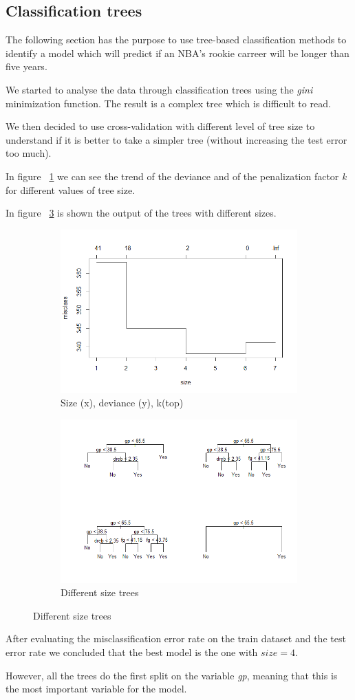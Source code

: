 \subsection{Classification trees}

The following section has the purpose to use tree-based classification methods to identify a model which will predict if an NBA's rookie carreer will be longer than five years.

We started to analyse the data through classification trees using the \textit{gini} minimization function. The result is a complex tree which is difficult to read.

We then decided to use cross-validation with different level of tree size to understand if it is better to take a simpler tree (without increasing the test error too much).

In figure \Fig~\ref{fig:tree_cv_plot} we can see the trend of the deviance and of the penalization factor \textit{k} for different values of tree size.

In figure \Fig~\ref{fig:tree_prune_comparison} is shown the output of the trees with different sizes.

\begin{figure}[h]
	\centering
	\begin{subfigure}{.6\textwidth}
		\centering
		\includegraphics[width=0.5\linewidth]{ImageFiles/Classification/tree_cv_plot}
		\caption{Size (x), deviance (y), k(top)}
		\label{fig:tree_cv_plot}
	\end{subfigure}%
	\begin{subfigure}{.6\textwidth}
		\centering
		\includegraphics[width=0.5\linewidth]{ImageFiles/Classification/tree_prune_comparison}
		\caption{Different size trees}
		\label{fig:tree_prune_comparison}
	\end{subfigure}
\end{figure}

After evaluating the misclassification error rate on the train dataset and the test error rate we concluded that the best model is the one with $size = 4$.

However, all the trees do the first split on the variable \textit{gp}, meaning that this is the most important variable for the model.
